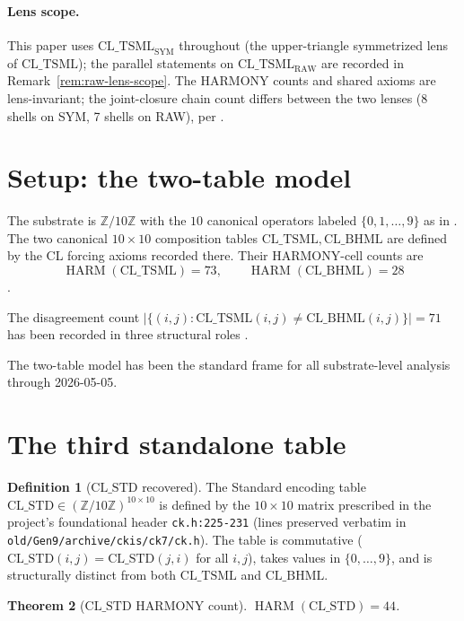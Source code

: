 \documentclass[11pt,reqno]{amsart}
\newtheorem{theorem}{Theorem}[section]
\theoremstyle{definition}
\newtheorem{definition}[theorem]{Definition}
\newcommand{\Z}{\mathbb{Z}}
\newcommand{\TSML}{\mathrm{CL\_TSML}}
\newcommand{\BHML}{\mathrm{CL\_BHML}}
\newcommand{\STDx}{\mathrm{CL\_STD}}
\DeclareMathOperator{\HARM}{HARM}
\begin{document}
\paragraph{Lens scope.}

This paper uses $\TSML_{\mathrm{SYM}}$ throughout (the
upper-triangle symmetrized lens of $\TSML$); the parallel statements
on $\TSML_{\mathrm{RAW}}$ are recorded in
Remark~\ref{rem:raw-lens-scope}. The HARMONY counts and shared
axioms are lens-invariant; the joint-closure chain count differs
between the two lenses (8 shells on SYM, 7 shells on RAW), per
\cite{Sanders2026LensDependence}.

\section{Setup: the two-table model}
\label{sec:setup}

The substrate is $\Z/10\Z$ with the $10$ canonical operators labeled
$\{0, 1, \ldots, 9\}$ as in \cite{Sanders2026CLAxioms}. The two
canonical $10 \times 10$ composition tables $\TSML, \BHML$ are
defined by the CL forcing axioms recorded there. Their HARMONY-cell
counts are
\[
  \HARM(\TSML) = 73, \qquad \HARM(\BHML) = 28
\]
\cite{Sanders2026LensInvariance}.

The disagreement count
$|\{(i, j) : \TSML(i, j) \neq \BHML(i, j)\}| = 71$ has been recorded
in three structural roles \cite{Sanders2026HARMladder}.

The two-table model has been the standard frame for all
substrate-level analysis through 2026-05-05.

\section{The third standalone table}
\label{sec:third}

\begin{definition}[$\STDx$ recovered]
\label{def:std}
The Standard encoding table $\STDx \in (\Z/10\Z)^{10 \times 10}$ is
defined by the $10 \times 10$ matrix prescribed in the project's
foundational header
\texttt{ck.h:225-231} (lines preserved verbatim in
\texttt{old/Gen9/archive/ckis/ck7/ck.h}). The table is commutative
($\STDx(i, j) = \STDx(j, i)$ for all $i, j$), takes values in
$\{0, \ldots, 9\}$, and is structurally distinct from both $\TSML$
and $\BHML$.
\end{definition}

\begin{theorem}[$\STDx$ HARMONY count]
\label{thm:std-44}
$\HARM(\STDx) = 44$.
\end{theorem}
\end{document}
